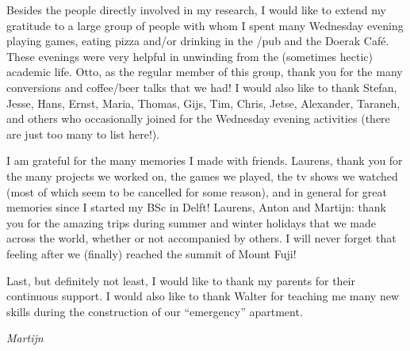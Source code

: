 Besides the people directly involved in my research, I would like to extend my gratitude to a large group of people with whom I spent many Wednesday evening playing games, eating pizza and/or drinking in the /pub and the Doerak Café.
These evenings were very helpful in unwinding from the (sometimes hectic) academic life.
Otto, as the regular member of this group, thank you for the many conversions and coffee/beer talks that we had!
I would also like to thank Stefan, Jesse, Hans, Ernst, Maria, Thomas, Gijs, Tim, Chris, Jetse, Alexander, Taraneh, and others who occasionally joined for the Wednesday evening activities (there are just too many to list here!).

I am grateful for the many memories I made with friends.
Laurens, thank you for the many projects we worked on, the games we played, the tv shows we watched (most of which seem to be cancelled for some reason), and in general for great memories since I started my BSc in Delft!
Laurens, Anton and Martijn: thank you for the amazing trips during summer and winter holidays that we made across the world, whether or not accompanied by others.
I will never forget that feeling after we (finally) reached the summit of Mount Fuji!\emojifuji{}

Last, but definitely not least, I would like to thank my parents for their continuous support.
I would also like to thank Walter for teaching me many new skills during the construction of our \enquote{emergency} apartment.

\begin{flushright}
{\makeatletter\itshape
    Martijn
\makeatother}
\end{flushright}
